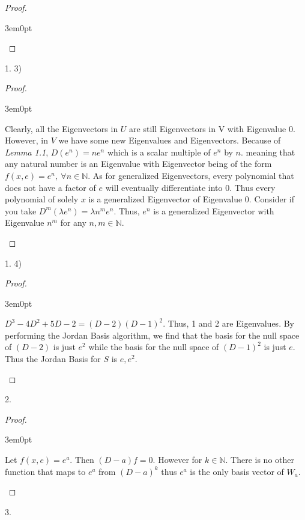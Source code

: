 \documentclass[11pt]{article}
\newcommand{\N}{\mathbb{N}}
\newenvironment{myproof}
{\begin{proof} \begin{adjustwidth}{3em}{0pt}$ $\par\nobreak\ignorespaces}
{\end{adjustwidth} \end{proof}}
\begin{document}
\begin{flushleft}
\begin{myproof}
\end{myproof}

1. 3)

\begin{myproof}

Clearly, all the Eigenvectors in $U$ are still Eigenvectors in V with Eigenvalue 0. However, in $V$ we have some new Eigenvalues and Eigenvectors. Because of \textit{Lemma 1.1}, $D(e^n) = ne^n$ which is a scalar multiple of $e^n$ by $n$. meaning that any natural number is an Eigenvalue with Eigenvector being of the form $f(x,e) = e^n, \ \forall n \in \N$. As for generalized Eigenvectors, every polynomial that does not have a factor of $e$ will eventually differentiate into 0. Thus every polynomial of solely $x$ is a generalized Eigenvector of Eigenvalue 0. Consider if you take $D^m(\lambda e^n) = \lambda n^me^n$. Thus, $e^n$ is a generalized Eigenvector with Eigenvalue $n^m$ for any $n,m \in \N$.

\end{myproof}

1. 4)

\begin{myproof}

$D^3-4D^2+5D-2 = (D-2)(D-1)^2$. Thus, 1 and 2 are Eigenvalues. By performing the Jordan Basis algorithm, we find that the basis for the null space of $(D-2)$ is just $e^2$ while the basis for the null space of $(D-1)^2$ is just $e$. Thus the Jordan Basis for $S$ is $e,e^2$.

\end{myproof}

\newpage

2.

\begin{myproof}

Let $f(x,e) = e^a$. Then $(D-a)f = 0$. However for $k \in \N$. There is no other function that maps to $e^a$ from $(D-a)^k$ thus $e^a$ is the only basis vector of $W_a$.

\end{myproof}

\newpage

3.


\end{flushleft}
\end{document}

